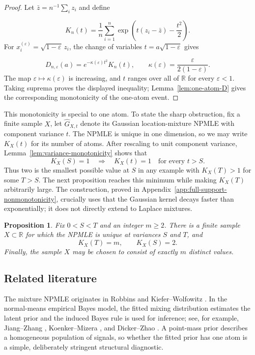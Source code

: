 \documentclass[11pt]{article}
\newtheorem{proposition}[theorem]{Proposition}
\theoremstyle{definition}
\numberwithin{equation}{section}
\newcommand{\R}{\mathbb{R}}
\newcommand{\eps}{\varepsilon}
\begin{document}
\begin{proof}
Let \(\bar z=n^{-1}\sum_i z_i\) and define

\[
    K_n(t)=\frac1n\sum_{i=1}^n
       \exp\left(t(z_i-\bar z)-\frac{t^2}{2}\right).
\]
For \(x_i^{(\eps)}=\sqrt{1-\eps}\,z_i\), the change of variables
\(t=a\sqrt{1-\eps}\) gives

\[
    D_{n,\eps}(a)=e^{-\kappa(\eps)t^2}K_n(t),
    \qquad \kappa(\eps)=\frac{\eps}{2(1-\eps)}.
\]
The map \(\eps\mapsto\kappa(\eps)\) is increasing, and \(t\) ranges over all
of \(\R\) for every \(\eps<1\). Taking suprema proves the displayed
inequality; Lemma~\ref{lem:one-atom-D} gives the corresponding monotonicity of
the one-atom event.
\end{proof}

This monotonicity is special to one atom. To state the sharp obstruction, fix
a finite sample \(X\), let \(\widehat G_{X,t}\) denote its Gaussian
location-mixture NPMLE with component variance \(t\). The NPMLE is unique in
one dimension, so we may write \(K_X(t)\) for its number of atoms. After
rescaling to unit component variance, Lemma~\ref{lem:variance-monotonicity}
shows that
\[
    K_X(S)=1\quad\Longrightarrow\quad K_X(t)=1
    \quad\text{for every }t>S.
\]
Thus two is the smallest possible value at \(S\) in any example with
\(K_X(T)>1\) for some \(T>S\). The next proposition reaches this minimum
while making \(K_X(T)\) arbitrarily large.
The construction, proved in
Appendix~\ref{app:full-support-nonmonotonicity}, crucially uses that the
Gaussian kernel decays faster than exponentially; it does not directly
extend to Laplace mixtures.
\begin{proposition}
\label{prop:full-support-nonmonotonicity}
Fix \(0<S<T\) and an integer \(m\ge2\). There is a finite sample \(X\subset
\mathbb R\) for which the NPMLE is unique at variances \(S\) and \(T\), and
\[
    K_X(T)=m,
    \qquad
    K_X(S)=2.
\]
Finally, the sample \(X\) may be chosen to consist of exactly \(m\) distinct
values.
\end{proposition}

\subsection{Related literature}

The mixture NPMLE originates in Robbins and Kiefer--Wolfowitz
\cite{robbins1950generalization,kiefer1956consistency}. In the normal-means
empirical Bayes model, the fitted mixing distribution estimates the latent
prior and the induced Bayes rule is used for inference; see, for example,
Jiang--Zhang \cite{jiang2009general}, Koenker--Mizera
\cite{koenker2014convex}, and Dicker--Zhao \cite{dicker2016high}. A point-mass
prior describes a homogeneous population of signals, so whether the fitted
prior has one atom is a simple, deliberately stringent structural diagnostic.
\end{document}

